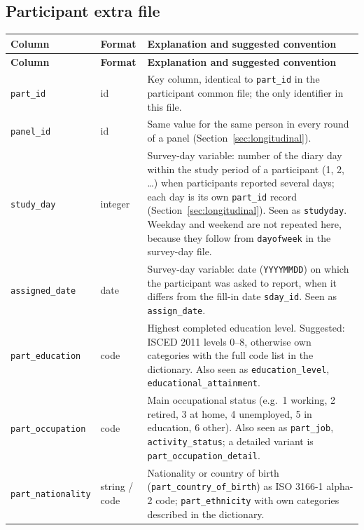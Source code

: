 \documentclass[11pt,a4paper]{article}
\begin{document}
\subsection*{Participant extra file}
{\footnotesize
\begin{longtable}{p{3.4cm} p{1.8cm} p{8.2cm}}
\toprule
\textbf{Column} & \textbf{Format} & \textbf{Explanation and suggested convention} \\
\midrule
\endfirsthead
\toprule
\textbf{Column} & \textbf{Format} & \textbf{Explanation and suggested convention} \\
\midrule
\endhead
\bottomrule
\endfoot
    \texttt{part\_\allowbreak{}id} & id & Key column, identical to \texttt{part\_\allowbreak{}id} in the participant common file; the only identifier in this file. \\
    \texttt{panel\_\allowbreak{}id} & id & Same value for the same person in every round of a panel (Section~\ref{sec:longitudinal}). \\
    \texttt{study\_\allowbreak{}day} & integer & Survey-day variable: number of the diary day within the study period of a participant (1, 2, \ldots) when participants reported several days; each day is its own \texttt{part\_\allowbreak{}id} record (Section~\ref{sec:longitudinal}). Seen as \texttt{studyday}. Weekday and weekend are not repeated here, because they follow from \texttt{dayofweek} in the survey-day file. \\
    \texttt{assigned\_\allowbreak{}date} & date & Survey-day variable: date (\texttt{YYYYMMDD}) on which the participant was asked to report, when it differs from the fill-in date \texttt{sday\_\allowbreak{}id}. Seen as \texttt{assign\_date}. \\
    \texttt{part\_\allowbreak{}education} & code & Highest completed education level. Suggested: ISCED 2011 levels 0--8, otherwise own categories with the full code list in the dictionary. Also seen as \texttt{education\_\allowbreak{}level}, \texttt{educational\_\allowbreak{}attainment}. \\
    \texttt{part\_\allowbreak{}occupation} & code & Main occupational status (e.g.\ 1 working, 2 retired, 3 at home, 4 unemployed, 5 in education, 6 other). Also seen as \texttt{part\_\allowbreak{}job}, \texttt{activity\_\allowbreak{}status}; a detailed variant is \texttt{part\_\allowbreak{}occupation\_\allowbreak{}detail}. \\
    \texttt{part\_\allowbreak{}nationality} & string / code & Nationality or country of birth (\texttt{part\_\allowbreak{}country\_\allowbreak{}of\_\allowbreak{}birth}) as ISO 3166-1 alpha-2 code; \texttt{part\_\allowbreak{}ethnicity} with own categories described in the dictionary. \\

\end{longtable}}
\end{document}
